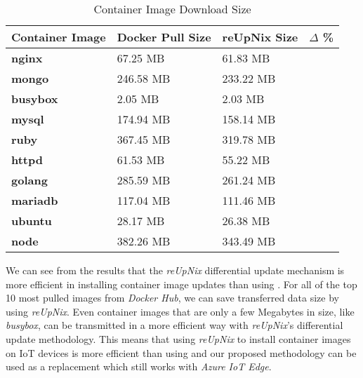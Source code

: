 \clearpage

\begin{table}[H]
	\centering
	\begin{tabular}{l|l|l|l}
	\toprule
		Container Image & Docker Pull Size & reUpNix Size & $\Delta$ \% \\
	\midrule
    \textbf{nginx} & 67.25 MB & 61.83 MB & \color{ba-green}{- 8.0\%} \\
    \textbf{mongo} & 246.58 MB & 233.22 MB & \color{ba-green}{- 5.6\%} \\
    \textbf{busybox} & 2.05 MB & 2.03 MB & \color{ba-green}{- 0.9\%} \\
    \textbf{mysql} & 174.94 MB & 158.14 MB & \color{ba-green}{- 9.6\%} \\
    \textbf{ruby} & 367.45 MB & 319.78 MB & \color{ba-green}{- 12.9\%} \\
    \textbf{httpd} & 61.53 MB & 55.22 MB & \color{ba-green}{- 10.2\%} \\
    \textbf{golang} & 285.59 MB & 261.24 MB & \color{ba-green}{- 8.5\%} \\
    \textbf{mariadb} & 117.04 MB & 111.46 MB & \color{ba-green}{- 4.7\%} \\
    \textbf{ubuntu} & 28.17 MB & 26.38 MB & \color{ba-green}{- 6.3\%} \\
    \textbf{node} & 382.26 MB & 343.49 MB & \color{ba-green}{- 10.1\%} \\
	\bottomrule
	\end{tabular}
	\caption{Container Image Download Size}
	\label{tab:container-size}
\end{table}

\noindent
We can see from the results that the \textit{reUpNix} differential update mechanism
is more efficient in installing container image updates than using .
For all of the top 10 most pulled images from \textit{Docker Hub}, we can save
transferred data size by using \textit{reUpNix}. Even container images that are
only a few Megabytes in size, like \textit{busybox}, can be transmitted in a more
efficient way with \textit{reUpNix}'s differential update methodology. This means
that using \textit{reUpNix} to install container images on \ac{IoT} devices is more
efficient than using  and our proposed methodology can be used
as a replacement which still works with \textit{Azure IoT Edge}.

